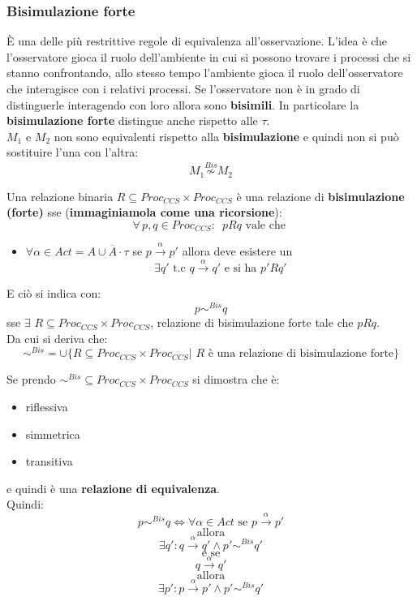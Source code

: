 \subsubsection{Bisimulazione forte}
È una delle più restrittive regole di equivalenza all'osservazione. L'idea è che l'osservatore gioca il ruolo dell'ambiente in cui si possono trovare i processi che si stanno confrontando, allo stesso tempo l'ambiente gioca il ruolo dell'osservatore che interagisce con i relativi processi. Se l'osservatore non è in grado di distinguerle interagendo con loro allora sono \textbf{bisimili}. In particolare la \textbf{bisimulazione forte} distingue anche rispetto alle $\tau$.\\ $M_1$ e $M_2$ non sono equivalenti rispetto alla \textbf{bisimulazione} e quindi non
si può sostituire l'una con l'altra:
\[M_1\stackrel{Bis}{\not\sim}M_2\]
\begin{definizione}
  Una relazione binaria $R\subseteq Proc_{CCS}\times Proc_{CCS}$ è una
  relazione di \textbf{bisimulazione (forte)} sse (\textbf{immaginiamola come una ricorsione}):
  \[\forall\, p, q\in Proc_{CCS}:\,\,\, pRq \mbox{ vale che }\]
  \begin{itemize}
    \item $\forall \alpha\in Act=A\cup \overline{A}\cdot \tau$ se
    $p\stackrel{\alpha}{\rightarrow}p'$ allora deve esistere un \[\exists
    q'\mbox{ t.c }q\stackrel{\alpha}{\rightarrow}q'\mbox{ e si ha }p'Rq'\]
\end{itemize}
E ciò si indica con:
\[p\sim^{Bis}q\]
sse $\exists\,\, R\subseteq Proc_{CCS}\times Proc_{CCS}$, relazione di
bisimulazione forte tale che $pRq$.\\
Da cui si deriva che:
\[\sim^{Bis}=\cup\{R\subseteq Proc_{CCS}\times Proc_{CCS}|\,\, R \mbox{ è una
    relazione di bisimulazione forte}\}\]
\end{definizione}
\begin{definizione}
  Se prendo $\sim^{Bis}\subseteq Proc_{CCS}\times Proc_{CCS}$ si dimostra che è:
  \begin{itemize}
    \item riflessiva
    \item simmetrica
    \item transitiva
  \end{itemize}
  e quindi è una \textbf{relazione di equivalenza}.\\
  Quindi:
  \[p\sim^{Bis}q\iff \forall\alpha\in Act \mbox{ se }
    p\stackrel{\alpha}{\rightarrow}p'\]
  \[\mbox{ allora }\]
  \[\exists q': q\stackrel{\alpha}{\rightarrow}q'\land p'\sim^{Bis}q'\]
  \[\mbox{ e se }\]
  \[q\stackrel{\alpha}{\rightarrow}q' \]
  \[\mbox{ allora }\]
  \[\exists p': p\stackrel{\alpha}{\rightarrow}p'\land p'\sim^{Bis}q'\]
  
\end{definizione}

